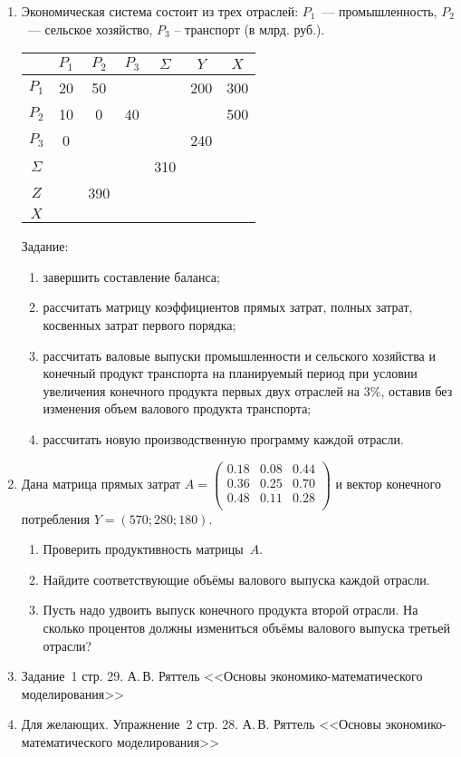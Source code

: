 \documentclass[a5paper,11pt]{extarticle}
\begin{document}
\begin{enumerate}
\item Экономическая система состоит из трех отраслей: 
$P_1$~--- промышленность, 
$P_2$~--- сельское хозяйство, 
$P_3$ – транспорт (в млрд. руб.).

{\centering \begin{tabular}{|c|c|c|c|c|c|c|}
    \hline
    & $P_1$ & $P_2$ & $P_3$ & $\Sigma$ & $Y$ & $X$ \\
    \hline
    $P_1$    & 20    & 50    &       &          & 200 & 300 \\
    \hline
    $P_2$    & 10    & 0     & 40    &          &     & 500 \\
    \hline
    $P_3$    & 0     &       &       &          & 240 &     \\ 
    \hline
    $\Sigma$ &       &       &       &  310     &     &     \\
    \hline
    $Z$      &       & 390   &       &          &     &     \\
    \hline
    $X$      &       &       &       &          &     &     \\
    \hline
\end{tabular}
\par}

Задание:
    \begin{enumerate}
        \item завершить составление баланса;
        \item рассчитать матрицу коэффициентов прямых затрат, полных затрат, косвенных затрат первого порядка;
        \item рассчитать валовые выпуски промышленности и сельского хозяйства и конечный продукт транспорта на планируемый период при условии увеличения конечного продукта первых двух отраслей на 3\%, оставив без изменения объем валового продукта транспорта;
        \item рассчитать новую производственную программу каждой отрасли.
    \end{enumerate}

\item Дана матрица прямых затрат 
$A=\begin{pmatrix}
        0.18 & 0.08 & 0.44\\
        0.36 & 0.25 & 0.70\\
        0.48 & 0.11 & 0.28\\
\end{pmatrix}$
и вектор конечного потребления $Y=(570; 280; 180)$.
\begin{enumerate}
    \item Проверить продуктивность матрицы~$A$.
    \item Найдите соответствующие объёмы валового выпуска каждой отрасли.
    \item Пусть надо удвоить выпуск конечного продукта второй
    отрасли. На сколько процентов должны измениться объёмы валового выпуска третьей отрасли?    
\end{enumerate}
\item Задание~1 стр. 29. А.\,В. Ряттель <<Основы экономико-математического моделирования>>
\item Для желающих. Упражнение~2 стр. 28. А.\,В. Ряттель <<Основы экономико-математического моделирования>>
\end{enumerate}
\end{document}
